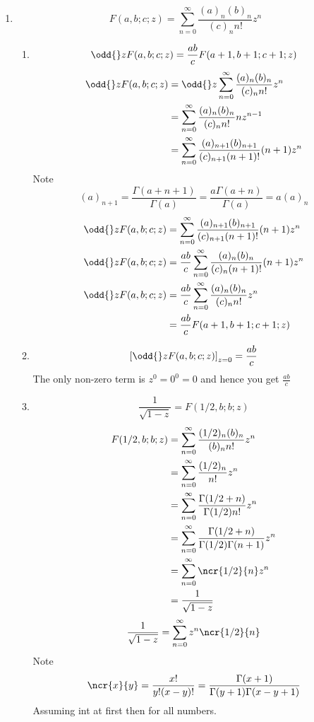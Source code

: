 \documentclass{X:/Documents/Coding/Latex/myassignment}
\begin{document}
\begin{enumerate}
	\item 
	\[F(a,b;c;z) = \sum_{n=0}^\infty \frac{(a)_n(b)_n}{(c)_n n!} z^n\]
	\begin{enumerate}
		\item 
		\[\odd{}z F(a,b;c;z) = \frac{ab}{c} F(a+1,b+1;c+1;z)\]
		\begin{align*}
			\odd{}z F(a,b;c;z) &= \odd{}z\sum_{n=0}^\infty \frac{(a)_n(b)_n}{(c)_n n!} z^n\\
			&=\sum_{n=0}^\infty \frac{(a)_n(b)_n}{(c)_n n!} nz^{n-1}\\
			&= \sum_{n=0}^\infty \frac{(a)_{n+1}(b)_{n+1}}{(c)_{n+1} (n+1)!} (n+1)z^{n}\\
		\end{align*}
		Note 
		\[(a)_{n+1} = \frac{\Gamma(a+n+1)}{\Gamma(a)} = \frac{a\Gamma(a+n)}{\Gamma(a)} = a(a)_{n}\]
		\begin{align*}
			\odd{}z F(a,b;c;z) &= \sum_{n=0}^\infty \frac{(a)_{n+1}(b)_{n+1}}{(c)_{n+1} (n+1)!} (n+1)z^{n}\\
			\odd{}z F(a,b;c;z) &= \frac{ab}{c}\sum_{n=0}^\infty \frac{(a)_{n}(b)_{n}}{(c)_{n} (n+1)!} (n+1)z^{n}\\
			\odd{}z F(a,b;c;z) &= \frac{ab}{c}\sum_{n=0}^\infty \frac{(a)_{n}(b)_{n}}{(c)_{n} n!} z^{n}\\
			&= \frac{ab}{c} F(a+1,b+1;c+1;z)
		\end{align*}
		\item 
		\[\left[\odd{}z F(a,b;c;z)\right]_{z=0} = \frac{ab}{c}\]
		The only non-zero term is $z^0 = 0^0 = 0$ and hence you get $\frac{ab}{c}$ 
		\item 
		\[\frac{1}{\sqrt{1-z}} = F(1/2,b;b;z)\]
		\begin{align*}
			F(1/2,b;b;z) &= \sum_{n=0}^\infty \frac{(1/2)_n(b)_n}{(b)_n n!} z^n\\
			&= \sum_{n=0}^\infty \frac{(1/2)_n}{n!} z^n\\
			&= \sum_{n=0}^\infty \frac{\Gamma(1/2 +n)}{\Gamma(1/2) n!} z^n\\
			&= \sum_{n=0}^\infty \frac{\Gamma(1/2 +n)}{\Gamma(1/2) \Gamma(n+1)} z^n\\
			&= \sum_{n=0}^\infty \ncr{1/2}{n} z^n\\
			&= \frac{1}{\sqrt{1-z}}
		\end{align*}
		\[\frac{1}{\sqrt{1-z}} = \sum_{n=0}^\infty z^n \ncr{1/2}{n}\]
		Note
		\[\ncr{x}{y} =\frac{x!}{y!(x-y)!} = \frac{\Gamma(x+1)}{\Gamma(y+1) \Gamma(x-y+1)}\]
		Assuming int at first then for all numbers.
	\end{enumerate}
\end{enumerate}
\end{document}
